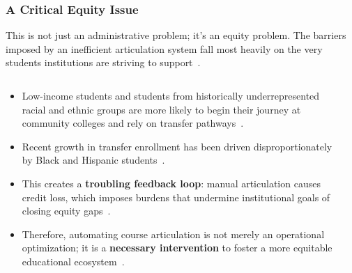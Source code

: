 \documentclass[aspectratio=169,10pt]{beamer}
\begin{document}
\begin{frame}
    \fontsize{9}{9}\selectfont
    \frametitle{A Critical Equity Issue}
    
    \begin{alertblock}{This is not just an administrative problem; it's an equity problem.}
        The barriers imposed by an inefficient articulation system fall most heavily on the very students institutions are striving to support~\cite{ace2025}.
    \end{alertblock}

    \vspace{1em}
    
    \begin{columns}[T]
        
        \begin{column}{0.6\textwidth}
            \begin{itemize}
                \item Low-income students and students from historically underrepresented racial and ethnic groups are more likely to begin their journey at community colleges and rely on transfer pathways~\cite{ace2025}.
                
                \item Recent growth in transfer enrollment has been driven disproportionately by Black and Hispanic students~\cite{nscnews2023}.
                
                \item This creates a \textbf{troubling feedback loop}: manual articulation causes credit loss, which imposes burdens that undermine institutional goals of closing equity gaps~\cite{ace2025,nscnews2023}.
                
                \item Therefore, automating course articulation is not merely an operational optimization; it is a \textbf{necessary intervention} to foster a more equitable educational ecosystem~\cite{collegeopportunity2017}.
                
            \end{itemize}
        \end{column}
    
        \begin{column}{0.4\textwidth}
            

\end{column}
\end{columns}
\end{frame}
\end{document}
